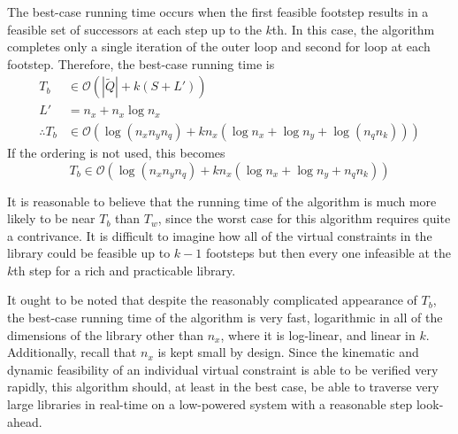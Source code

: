 The best-case running time occurs when the first feasible footstep results in a feasible set of successors at each step up to the $k$th. In this case, the algorithm completes only a single iteration of the outer loop and second for loop at each footstep. Therefore, the best-case running time is
\begin{align*}
	T_b &\in \mathcal{O}\left(|\tilde{Q}| + k(S + L')\right) \\
	L' &= n_x + n_x\log n_x \\
	\therefore T_b &\in \mathcal{O}\left(\log(n_xn_yn_q)+kn_x(\log n_x + \log n_y + \log(n_qn_k))\right)
\end{align*}
If the ordering is not used, this becomes
\[
T_b \in \mathcal{O}\left(\log(n_xn_yn_q)+kn_x(\log n_x + \log n_y + n_qn_k)\right)
\]

It is reasonable to believe that the running time of the algorithm is much more likely to be near $T_b$ than $T_w$, since the worst case for this algorithm requires quite a contrivance. It is difficult to imagine how all of the virtual constraints in the library could be feasible up to $k-1$ footsteps but then every one infeasible at the $k$th step for a rich and practicable library.

It ought to be noted that despite the reasonably complicated appearance of $T_b$, the best-case running time of the algorithm is very fast, logarithmic in all of the dimensions of the library other than $n_x$, where it is log-linear, and linear in $k$. Additionally, recall that $n_x$ is kept small by design. Since the kinematic and dynamic feasibility of an individual virtual constraint is able to be verified very rapidly, this algorithm should, at least in the best case, be able to traverse very large libraries in real-time on a low-powered system with a reasonable step look-ahead.